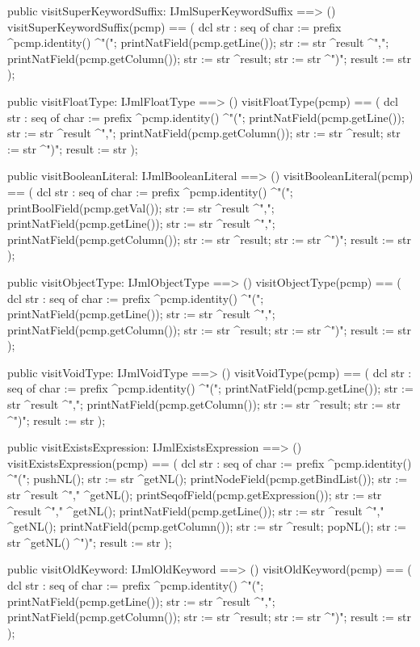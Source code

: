 \begin{vdm_al}
  public visitSuperKeywordSuffix: IJmlSuperKeywordSuffix ==> ()
  visitSuperKeywordSuffix(pcmp) ==
    ( dcl str : seq of char := prefix ^pcmp.identity() ^"(";
      printNatField(pcmp.getLine());
      str := str ^result ^",";
      printNatField(pcmp.getColumn());
      str := str ^result;
      str := str ^")";
      result := str );

  public visitFloatType: IJmlFloatType ==> ()
  visitFloatType(pcmp) ==
    ( dcl str : seq of char := prefix ^pcmp.identity() ^"(";
      printNatField(pcmp.getLine());
      str := str ^result ^",";
      printNatField(pcmp.getColumn());
      str := str ^result;
      str := str ^")";
      result := str );

  public visitBooleanLiteral: IJmlBooleanLiteral ==> ()
  visitBooleanLiteral(pcmp) ==
    ( dcl str : seq of char := prefix ^pcmp.identity() ^"(";
      printBoolField(pcmp.getVal());
      str := str ^result ^",";
      printNatField(pcmp.getLine());
      str := str ^result ^",";
      printNatField(pcmp.getColumn());
      str := str ^result;
      str := str ^")";
      result := str );

  public visitObjectType: IJmlObjectType ==> ()
  visitObjectType(pcmp) ==
    ( dcl str : seq of char := prefix ^pcmp.identity() ^"(";
      printNatField(pcmp.getLine());
      str := str ^result ^",";
      printNatField(pcmp.getColumn());
      str := str ^result;
      str := str ^")";
      result := str );

  public visitVoidType: IJmlVoidType ==> ()
  visitVoidType(pcmp) ==
    ( dcl str : seq of char := prefix ^pcmp.identity() ^"(";
      printNatField(pcmp.getLine());
      str := str ^result ^",";
      printNatField(pcmp.getColumn());
      str := str ^result;
      str := str ^")";
      result := str );

  public visitExistsExpression: IJmlExistsExpression ==> ()
  visitExistsExpression(pcmp) ==
    ( dcl str : seq of char := prefix ^pcmp.identity() ^"(";
      pushNL();
      str := str ^getNL();
      printNodeField(pcmp.getBindList());
      str := str ^result ^"," ^getNL();
      printSeqofField(pcmp.getExpression());
      str := str ^result ^"," ^getNL();
      printNatField(pcmp.getLine());
      str := str ^result ^"," ^getNL();
      printNatField(pcmp.getColumn());
      str := str ^result;
      popNL();
      str := str ^getNL() ^")";
      result := str );

  public visitOldKeyword: IJmlOldKeyword ==> ()
  visitOldKeyword(pcmp) ==
    ( dcl str : seq of char := prefix ^pcmp.identity() ^"(";
      printNatField(pcmp.getLine());
      str := str ^result ^",";
      printNatField(pcmp.getColumn());
      str := str ^result;
      str := str ^")";
      result := str );


\end{vdm_al}
